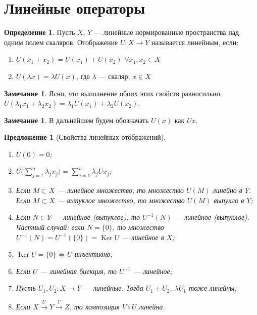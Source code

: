 \documentclass[11pt,openany,a4paper]{scrartcl}
\theoremstyle{plain}
\newtheorem{proposition}[theorem]{Предложение}
\theoremstyle{definition}
\newtheorem{definition}[theorem]{Определение}
\newtheorem{remark}[theorem]{Замечание}
\newcommand{\overto}[1]{\xrightarrow{#1}}
\DeclareMathOperator{\Ker}{Ker}
\begin{document}
\section{Линейные операторы}
\begin{definition}
    Пусть $X$, $Y$ — линейные нормированные пространства над одним полем скаляров.
    Отображение $U: X \to Y$ называется линейным, если:
    \begin{enumerate}
        \item $U(x_1+x_2) = U(x_1) + U(x_2)$ $\forall x_1, x_2 \in X$
        \item $U(\lambda x) = \lambda U(x)$, где $\lambda$ — скаляр, $x \in X$
    \end{enumerate}
\end{definition}
\begin{remark}
    Ясно, что выполнение обоих этих свойств равносильно
    $U(\lambda_1x_1 + \lambda_2x_2) = \lambda_1U(x_1) + \lambda_2U(x_2)$.
\end{remark}
\begin{remark}
    В дальнейшем будем обозначать $U(x)$ как $Ux$.
\end{remark}
\begin{proposition}[Свойства линейных отображений]
\mbox{}
    \begin{enumerate}
        \item $U(0) = 0$;
        \item $U\bigg(\sum\limits_{j=1}^n \lambda_j x_j\bigg) = \sum\limits_{j=1}^n
        \lambda_j Ux_j$;
        \item\label{image_linearity} Если $M \subset X$ — линейное множество,
        то множество
        $U(M)$ линейно в $Y$. Если $M \subset X$ — выпуклое множество,
        то множество $U(M)$ выпукло в $Y$;
        \item\label{preimage_linearity} Если $N \in Y$ — линейное (выпуклое),
        то $U^{-1}(N)$ — линейное (выпуклое). Частный случай: если $N = \{0\}$, то множество
        $U^{-1}(N) = U^{-1}(\{0\}) = \Ker U$ — линейное в $X$;
        \item $\Ker U = \{0\} \iff U$ инъективно;
        \item\label{inverse_linearity} Если $U$ — линейная биекция, то
        $U^{-1}$ — линейное;
        \item Пусть $U_1, U_2: X \to Y$ — линейные. Тогда $U_1 + U_2$,
        $\lambda U_1$ тоже линейны;
        \item Если $X \overto{U} Y \overto{V} Z$, то композиция $V\circ U$
        линейна.
    \end{enumerate}
\end{proposition}
\end{document}
